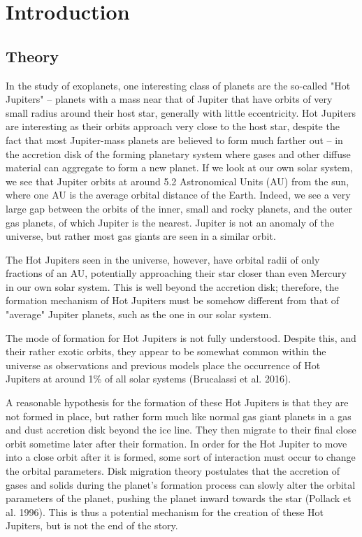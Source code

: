 \documentclass[12pt]{article}
\begin{document}
\clearpage

\section{Introduction}

\subsection{Theory}

In the study of exoplanets, one interesting class of planets are the so-called "Hot Jupiters" -- planets with a mass near that of Jupiter 
that have orbits of very small radius around their host star, generally with little eccentricity.
Hot Jupiters are interesting as their orbits approach very close to the host star,
despite the fact that most Jupiter-mass planets are believed to form much farther
out -- in the accretion disk of the forming planetary system where gases 
and other diffuse material can aggregate to form a new planet. If we look at our own
solar system, we see that Jupiter orbits at around 5.2 Astronomical Units (AU) from the
sun, where one AU is the average orbital distance of the Earth. Indeed,
we see a very large gap between the orbits of the inner, small and rocky planets, and
the outer gas planets, of which Jupiter is the nearest. Jupiter is not an anomaly of
the universe, but rather most gas giants are seen in a similar orbit. %

The Hot Jupiters seen in the universe, however, have orbital 
radii of only fractions of an AU, potentially 
approaching their star closer than even Mercury in our own solar system. %
This is well beyond the accretion disk; therefore, the formation mechanism of Hot Jupiters
must be somehow different from that of "average" Jupiter planets, such as the one in our
solar system.

The mode of formation for Hot Jupiters is not fully understood.
Despite this, and their rather exotic orbits, 
they appear to be somewhat common within the universe as observations and previous models place the occurrence of Hot Jupiters at around 1\% of all solar systems (Brucalassi et al. 2016).  

A reasonable hypothesis for the formation of these Hot Jupiters is that they are not formed in place, but rather form much like normal gas giant planets 
in a gas and dust accretion disk beyond the ice line. They then migrate to their final close orbit sometime later after their formation. 
In order for the Hot Jupiter to move into a close orbit after it is formed, some sort of interaction must occur to change the orbital parameters. 
Disk migration theory postulates that the accretion of gases and 
solids during the planet's formation process can slowly alter the orbital 
parameters of the planet,
pushing the planet inward towards the star (Pollack et al. 1996).
This is thus a potential mechanism for the creation of these Hot Jupiters, but is not the end of the story.
\end{document}
